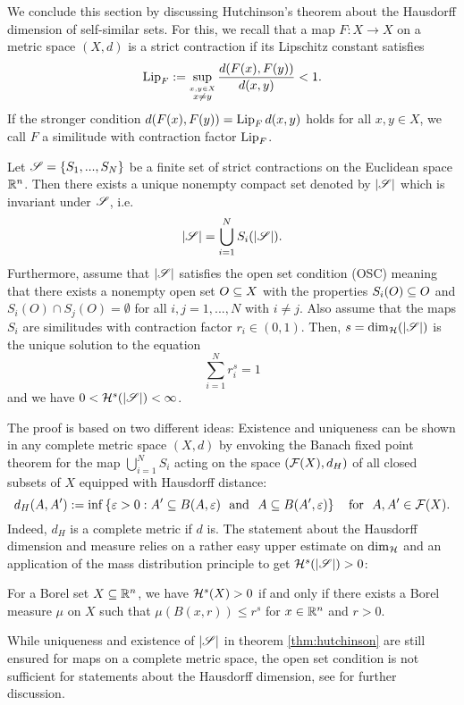 We conclude this section by discussing Hutchinson's theorem about the Hausdorff dimension of self-similar sets. For this, we recall that a map $F:X\to X$ on a metric space $(X,d)$ is a strict contraction if its Lipschitz constant satisfies
\begin{equation}\label{eq:Lip}
  \operatorname{Lip}_F:=\sup_{\stackrel{x,y\in X}{x\neq y}}\frac{d(F(x),F(y))}{d(x,y)}<1.
\end{equation}
If the stronger condition $d(F(x),F(y))=\operatorname{Lip}_F d(x,y)$ holds for all $x,y\in X$, we call $F$ a similitude with contraction factor $\operatorname{Lip}_F$.
\begin{thm}\label{thm:hutchinson}
  Let $\mathscr{S}=\{S_1,...,S_N\}$ be a finite set of strict contractions on the Euclidean space $\mathbb{R}^n$. Then there exists a unique nonempty compact set denoted by $|\mathscr{S}|$ which is invariant under $\mathscr{S}$, i.e.
  \[
    |\mathscr{S}|=\bigcup_{i=1}^N S_i(|\mathscr{S}|).
  \]
  Furthermore, assume that $|\mathscr{S}|$ satisfies the open set condition (OSC) meaning that there exists a nonempty open set $O\subseteq X$ with the properties $S_i(O)\subseteq O$ and $S_i(O)\cap S_j(O)=\emptyset$ for all $i,j=1,...,N$ with $i\neq j$. Also assume that the maps $S_i$ are similitudes with contraction factor $r_i\in(0,1)$. Then, $s=\dim_{\mathcal{H}}(|\mathscr{S}|)$ is the unique solution to the equation
  \[
    \sum_{i=1}^N r_i^s=1
  \]
  and we have $0<\mathcal{H}^s(|\mathscr{S}|)<\infty$. 
\end{thm}
The proof is based on two different ideas: Existence and uniqueness can be shown in any complete metric space $(X,d)$ by envoking the Banach fixed point theorem for the map $\bigcup_{i=1}^N S_i$ acting on the space $(\mathcal{F}(X),d_H)$ of all closed subsets of $X$ equipped with Hausdorff distance:
\[
  d_H(A,A'):=\inf\left\{\gep>0:A'\ssq B(A,\gep)\ \text{ and }\ 
         A\ssq B(A',\gep)\right\}\ \ \text{ for }\ A,A'\in\cF(X).
\]
Indeed, $d_H$ is a complete metric if $d$ is. The statement about the Hausdorff dimension and measure relies on a rather easy upper estimate on $\dim_{\mathcal{H}}$ and an application of the mass distribution principle to get $\mathcal{H}^s(|\mathscr{S}|)>0$: 
\begin{lem}
  For a Borel set $X\subseteq\mathbb{R}^n$, we have $\mathcal{H}^s(X)>0$ if and only if there exists a Borel measure $\mu$ on $X$ such that 
  $\mu(B(x,r))\leq r^s$ for $x\in\mathbb{R}^n$ and $r>0$.
\end{lem}
While uniqueness and existence of $|\mathscr{S}|$ in theorem \ref{thm:hutchinson} are still ensured for maps on a complete metric space, the open set condition is not sufficient for statements about the Hausdorff dimension, see \cite{schief1996self} for further discussion. 



